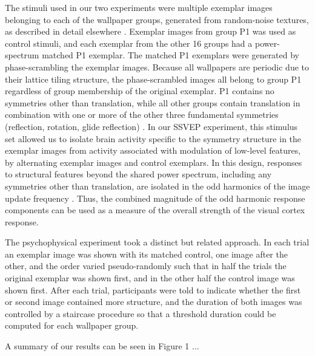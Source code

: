 \documentclass[9pt,twocolumn,twoside,lineno]{pnas-new}
\begin{document}
The stimuli used in our two experiments were multiple exemplar images belonging to each of the wallpaper groups, generated from random-noise textures, as described in detail elsewhere \cite{RN1725}. Exemplar images from group P1 was used as control stimuli, and each exemplar from the other 16 groups had a power-spectrum matched P1 exemplar. The matched P1 exemplars were generated by phase-scrambling the exemplar images. Because all wallpapers are periodic due to their lattice tiling structure, the phase-scrambled images all belong to group P1 regardless of group membership of the original exemplar. P1 contains no symmetries other than translation, while all other groups contain translation in combination with one or more of the other three fundamental symmetries (reflection, rotation, glide reflection) \cite{RN1425}. In our SSVEP experiment, this stimulus set allowed us to isolate brain activity specific to the symmetry structure in the exemplar images from activity associated with modulation of low-level features, by alternating exemplar images and control exemplars. In this design, responses to structural features beyond the shared power spectrum, including any symmetries other than translation, are isolated in the odd harmonics of the image update frequency \cite{RN1725,RN1540, RN1954}. Thus, the combined magnitude of the odd harmonic response components can be used as a measure of the overall strength of the visual cortex response.

The psychophysical experiment took a distinct but related approach. In each trial an exemplar image was shown with its matched control, one image after the other, and the order varied pseudo-randomly such that in half the trials the original exemplar was shown first, and in the other half the control image was shown first. After each trial, participants were told to indicate whether the first or second image contained more structure, and the duration of both images was controlled by a staircase procedure so that a threshold duration could be computed for each wallpaper group. 

A summary of our results can be seen in Figure 1 ...
\end{document}
